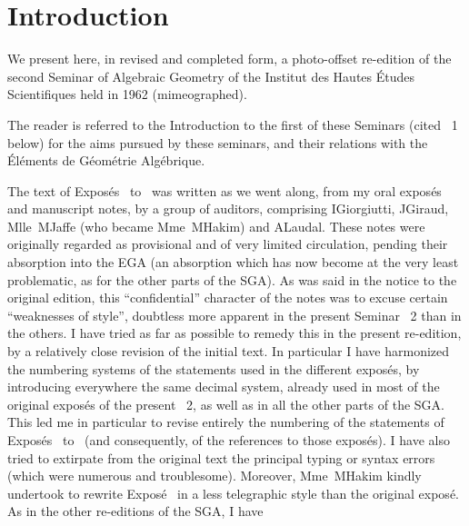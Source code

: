 \chapter*{Introduction}
\label{I.0}

We present here, in revised and completed form, a photo-offset re-edition
of the second Seminar of Algebraic Geometry of the Institut des Hautes
\'Etudes Scientifiques held in 1962 (mimeographed).

The reader is referred to the Introduction to the first of these Seminars
(cited \SGA~1 below) for the aims pursued by these seminars, and their
relations with the \'El\'ements de G\'eom\'etrie Alg\'ebrique.

The text of Expos\'es~ to~ was written as we went along,
from my oral expos\'es and manuscript notes, by a group of auditors,
comprising I\ptbl Giorgiutti, J\ptbl Giraud, Mlle~M\ptbl Jaffe (who became
Mme~M\ptbl Hakim) and A\ptbl Laudal. These notes were originally regarded
as provisional and of very limited circulation, pending their absorption
into the EGA (an absorption which has now become at the very least
problematic, as for the other parts of the SGA). As was said in the
notice to the original edition, this ``confidential'' character of the
notes was to excuse certain ``weaknesses of style'', doubtless more
apparent in the present Seminar \SGA~2 than in the others. I have tried
as far as possible to remedy this in the present re-edition, by a
relatively close revision of the initial text. In particular I have
harmonized the numbering systems of the statements used in the different
expos\'es, by introducing everywhere the same decimal system, already
used in most of the original expos\'es of the present \SGA~2, as well as
in all the other parts of the SGA. This led me in particular to revise
entirely the numbering of the statements of Expos\'es~ to~
(and consequently, of the references to those expos\'es). I have also
tried to extirpate from the original text the principal typing or syntax
errors (which were numerous and troublesome). Moreover, Mme~M\ptbl Hakim
kindly undertook to rewrite Expos\'e~ in a less telegraphic style
than the original expos\'e. As in the other re-editions of the SGA, I have
